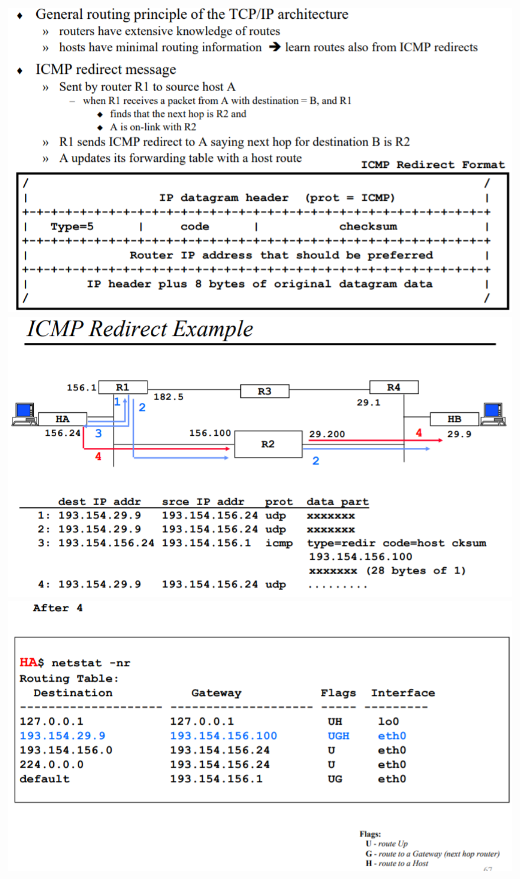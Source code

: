 \documentclass[../resumosRCOM.tex]{subfiles}
\begin{document}
\begin{center}
    \includegraphics[width=14cm]{images/RCOM32.png}
    \includegraphics[width=14cm]{images/RCOM33.png}
    \includegraphics[width=14cm]{images/RCOM34.png}
\end{center}
\end{document}
